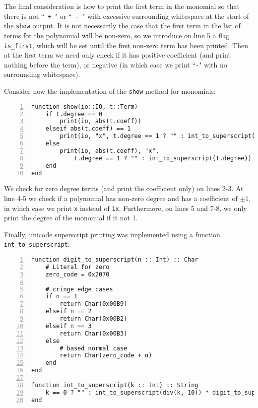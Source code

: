 \documentclass{article}
\theoremstyle{plain}
\numberwithin{theorem}{section}
\numberwithin{example}{section}
\theoremstyle{definition}
\numberwithin{definition}{section}
\begin{document}
The final consideration is how to print the first term in the monomial so that
there is not ``\texttt{ + }" or ``\texttt{ - }" with excessive surrounding
whitespace at the start of the \texttt{show} output. It is not necessarily the
case that the first term in the list of terms for the polynomial will be
non-zero, so we introduce on line 5 a flag \texttt{is\_first}, which will be set
until the first non-zero term has been printed. Then at the first term we need
only check if it has positive coefficient (and print nothing before the term),
or negative (in which case we print ``\texttt{-}" with no surrounding
whitespace). \medbreak

Consider now the implementation of the \texttt{show} method for monomials:

\begin{codebox}[term.jl]
    \begin{Verbatim}[numbers=left,xleftmargin=5mm]
function show(io::IO, t::Term)
    if t.degree == 0
        print(io, abs(t.coeff))
    elseif abs(t.coeff) == 1
        print(io, "x", t.degree == 1 ? "" : int_to_superscript(t.degree))
    else
        print(io, abs(t.coeff), "x",
            t.degree == 1 ? "" : int_to_superscript(t.degree))
    end
end
    \end{Verbatim}
\end{codebox}

We check for zero degree terms (and print the coefficient only) on lines 2-3. At
line 4-5 we check if a polynomial has non-zero degree and has a coefficient of
$\pm 1$, in which case we print \texttt{x} instead of \texttt{1x}. Furthermore,
on lines 5 and 7-8, we only print the degree of the monomial if it not 1.
\medbreak

Finally, unicode superscript printing was implemented using a function
\texttt{int\_to\_superscript}:

\begin{codebox}
    \begin{Verbatim}[numbers=left,xleftmargin=5mm]
function digit_to_superscript(n :: Int) :: Char
    # Literal for zero
    zero_code = 0x2070
    
    # cringe edge cases
    if n == 1
        return Char(0x00B9)
    elseif n == 2
        return Char(0x00B2)
    elseif n == 3
        return Char(0x00B3)
    else
        # based normal case
        return Char(zero_code + n)
    end
end

function int_to_superscript(k :: Int) :: String
    k == 0 ? "" : int_to_superscript(div(k, 10)) * digit_to_superscript(mod(k, 10))
end
    \end{Verbatim}
\end{codebox}
\end{document}

